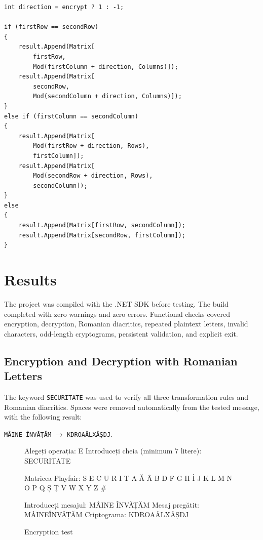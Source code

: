 \documentclass[12pt,a4paper]{article}
\begin{document}
\begin{lstlisting}[style=csharp,caption={Same-row, same-column, and rectangle rules}]
int direction = encrypt ? 1 : -1;

if (firstRow == secondRow)
{
    result.Append(Matrix[
        firstRow,
        Mod(firstColumn + direction, Columns)]);
    result.Append(Matrix[
        secondRow,
        Mod(secondColumn + direction, Columns)]);
}
else if (firstColumn == secondColumn)
{
    result.Append(Matrix[
        Mod(firstRow + direction, Rows),
        firstColumn]);
    result.Append(Matrix[
        Mod(secondRow + direction, Rows),
        secondColumn]);
}
else
{
    result.Append(Matrix[firstRow, secondColumn]);
    result.Append(Matrix[secondRow, firstColumn]);
}
\end{lstlisting}

\newpage
\section{Results}

The project was compiled with the .NET SDK before testing. The build completed with zero warnings and zero errors. Functional checks covered encryption, decryption, Romanian diacritics, repeated plaintext letters, invalid characters, odd-length cryptograms, persistent validation, and explicit exit.

\subsection{Encryption and Decryption with Romanian Letters}

The keyword \texttt{SECURITATE} was used to verify all three transformation rules and Romanian diacritics. Spaces were removed automatically from the tested message, with the following result:

\begin{center}
  \texttt{M\^{A}INE \^{I}NV\u{A}\c{T}\u{A}M}
  $\longrightarrow$
  \texttt{KDROA\^{A}LX\^{A}\c{S}DJ}.
\end{center}

\begin{figure}[H]
\centering
\caption{Encryption test}
\begin{minipage}{0.96\textwidth}
\begin{terminaloutput}
Alegeți operația: E
Introduceți cheia (minimum 7 litere): SECURITATE

Matricea Playfair:
S E C U R I T A
Ă Â B D F G H Î
J K L M N O P Q
Ș Ț V W X Y Z #

Introduceți mesajul: MÂINE ÎNVĂȚĂM
Mesaj pregătit: MÂINEÎNVĂȚĂM
Criptograma: KDROAÂLXÂȘDJ
\end{terminaloutput}
\end{minipage}
\end{figure}
\end{document}
